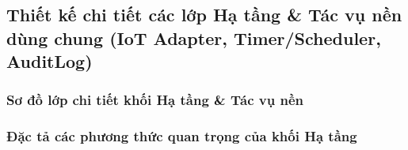 \subsection{Thiết kế chi tiết các lớp Hạ tầng \& Tác vụ nền dùng chung (IoT Adapter, Timer/Scheduler, AuditLog)}

\subsubsection{Sơ đồ lớp chi tiết khối Hạ tầng \& Tác vụ nền}


\subsubsection{Đặc tả các phương thức quan trọng của khối Hạ tầng}

